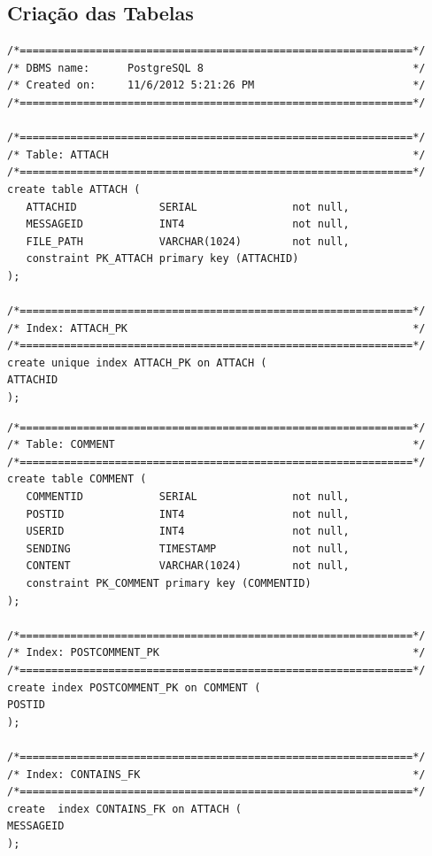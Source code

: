 \documentclass[a4paper, 12pt]{article}
\begin{document}
\subsection{Criação das Tabelas}
\begin{verbatim}
/*==============================================================*/
/* DBMS name:      PostgreSQL 8                                 */
/* Created on:     11/6/2012 5:21:26 PM                         */
/*==============================================================*/

/*==============================================================*/
/* Table: ATTACH                                                */
/*==============================================================*/
create table ATTACH (
   ATTACHID             SERIAL               not null,
   MESSAGEID            INT4                 not null,
   FILE_PATH            VARCHAR(1024)        not null,
   constraint PK_ATTACH primary key (ATTACHID)
);

/*==============================================================*/
/* Index: ATTACH_PK                                             */
/*==============================================================*/
create unique index ATTACH_PK on ATTACH (
ATTACHID
);
\end{verbatim}
\cleardoublepage
\begin{verbatim}
/*==============================================================*/
/* Table: COMMENT                                               */
/*==============================================================*/
create table COMMENT (
   COMMENTID            SERIAL               not null,
   POSTID               INT4                 not null,
   USERID               INT4                 not null,
   SENDING              TIMESTAMP            not null,
   CONTENT              VARCHAR(1024)        not null,
   constraint PK_COMMENT primary key (COMMENTID)
);

/*==============================================================*/
/* Index: POSTCOMMENT_PK                                        */
/*==============================================================*/
create index POSTCOMMENT_PK on COMMENT (
POSTID
);

/*==============================================================*/
/* Index: CONTAINS_FK                                           */
/*==============================================================*/
create  index CONTAINS_FK on ATTACH (
MESSAGEID
);
\end{verbatim}
\end{document}
